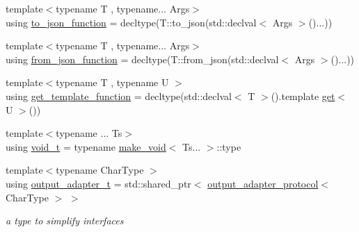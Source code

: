 \begin{DoxyCompactItemize}
\item 
{\footnotesize template$<$typename T , typename... Args$>$ }\\using \hyperlink{namespacenlohmann_1_1detail_af846b6cf2f926009ff3a7a61495ca383}{to\+\_\+json\+\_\+function} = decltype(T\+::to\+\_\+json(std\+::declval$<$ Args $>$()...))
\item 
{\footnotesize template$<$typename T , typename... Args$>$ }\\using \hyperlink{namespacenlohmann_1_1detail_a1711ee5cef66a0523055c8d9f024f322}{from\+\_\+json\+\_\+function} = decltype(T\+::from\+\_\+json(std\+::declval$<$ Args $>$()...))
\item 
{\footnotesize template$<$typename T , typename U $>$ }\\using \hyperlink{namespacenlohmann_1_1detail_ab4d22cdb6521ee3508db496dea66711e}{get\+\_\+template\+\_\+function} = decltype(std\+::declval$<$ T $>$().template \hyperlink{namespacenlohmann_1_1detail_acc422c11342b31368f610b6f96fcedc6}{get}$<$ U $>$())
\item 
{\footnotesize template$<$typename ... Ts$>$ }\\using \hyperlink{namespacenlohmann_1_1detail_a92a167c49c6697b6ffe4f79492c705e5}{void\+\_\+t} = typename \hyperlink{structnlohmann_1_1detail_1_1make__void}{make\+\_\+void}$<$ Ts... $>$\+::type
\item 
{\footnotesize template$<$typename Char\+Type $>$ }\\using \hyperlink{namespacenlohmann_1_1detail_a9b680ddfb58f27eb53a67229447fc556}{output\+\_\+adapter\+\_\+t} = std\+::shared\+\_\+ptr$<$ \hyperlink{structnlohmann_1_1detail_1_1output__adapter__protocol}{output\+\_\+adapter\+\_\+protocol}$<$ Char\+Type $>$ $>$
\begin{DoxyCompactList}\small\item\em a type to simplify interfaces \end{DoxyCompactList}\end{DoxyCompactItemize}
